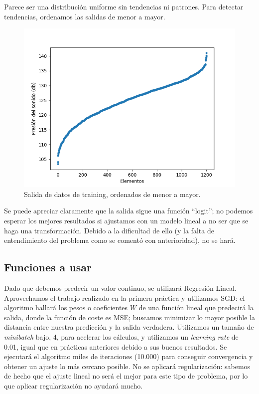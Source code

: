 \documentclass[12pt,spanish]{article} %
\begin{document}
Parece ser una distribución uniforme sin tendencias ni patrones. Para detectar tendencias, ordenamos las salidas de menor a mayor.

\begin{figure}[H]
  \begin{center}
  \includegraphics[scale=0.9]{s2}
  \caption{Salida de datos de training, ordenados de menor a mayor.}
  \label{fig:s2}
  \end{center}
\end{figure}

Se puede apreciar claramente que la salida sigue una función ``logit''; no podemos esperar los mejores resultados si ajustamos con un modelo lineal a no ser que se haga una transformación. Debido a la dificultad de ello (y la falta de entendimiento del problema como se comentó con anterioridad), no se hará.

\subsection{Funciones a usar}

Dado que debemos predecir un valor continuo, se utilizará Regresión Lineal. Aprovechamos el trabajo realizado en la primera práctica y utilizamos SGD: el algoritmo hallará los pesos o coeficientes $W$ de una función lineal que predecirá la salida, donde la función de coste es MSE; buscamos minimizar lo mayor posible la distancia entre nuestra predicción y la salida verdadera. Utilizamos un tamaño de \textit{minibatch} bajo, 4, para acelerar los cálculos, y utilizamos un \textit{learning rate} de 0.01, igual que en prácticas anteriores debido a sus buenos resultados. Se ejecutará el algoritmo miles de iteraciones (10.000) para conseguir convergencia y obtener un ajuste lo más cercano posible. No se aplicará regularización: sabemos de hecho que el ajuste lineal no será el mejor para este tipo de problema, por lo que aplicar regularización no ayudará mucho.
\end{document}
